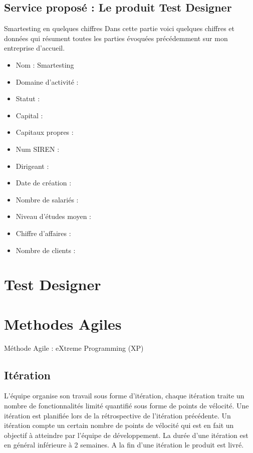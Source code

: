 \documentclass{article}
\begin{document}
\subsection{Service proposé : Le produit Test Designer}
Smartesting en quelques chiffres
Dans cette partie voici quelques chiffres et données qui résument toutes les parties évoquées précédemment sur mon entreprise d'accueil.
\begin{itemize}
\item{Nom : Smartesting} 
\item{Domaine d'activité :} 
\item{Statut :} 
\item{Capital :} 
\item{Capitaux propres :} 
\item{Num SIREN :} 
\item{Dirigeant :} 
\item{Date de création : } 
\item{Nombre de salariés :} 
\item{Niveau d'études moyen :} 
\item{Chiffre d'affaires :} 
\item{Nombre de clients :} 
\end{itemize}

\section{Test Designer}

\section{Methodes Agiles}
Méthode Agile : eXtreme Programming  (XP)
\subsection{Itération}
L'équipe organise son travail sous forme d'itération, chaque itération traite un nombre de fonctionnalités limité quantifié sous forme de points de vélocité. Une itération est planifiée lors de la rétrospective de l'itération précédente. Un itération compte un certain nombre de points de vélocité qui est en fait un objectif à atteindre par l'équipe de développement. La durée d'une itération est en général inférieure à 2 semaines. A la fin d'une itération le produit est livré.
\end{document}
